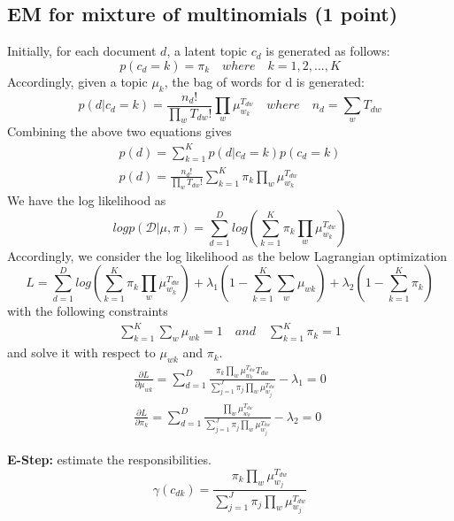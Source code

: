 \documentclass[12pt,a4paper]{article}
\begin{document}
	\subsection{EM for mixture of multinomials (1 point)}
	Initially, for each document $d$, a latent topic $c_d$ is generated as follows:
	\begin{equation}
		p(c_d=k) = \pi_k\quad where \quad k = 1,2,...,K
	\end{equation}
	Accordingly, given a topic $\mu_k$, the bag of words for d is generated:
	\begin{equation}
		p(d|c_d=k) = \frac{n_d!}{\prod_{w}T_{dw}!}\prod_{w}\mu_{w_k}^{T_{dw}}\quad where \quad n_d = \sum_{w} T_{dw}
	\end{equation}
	Combining the above two equations gives
	\begin{align*}
		p(d) = \sum_{k=1}^{K}p(d|c_d=k)p(c_d=k) \\
		p(d) =  \frac{n_d!}{\prod_{w}T_{dw}!}\sum_{k=1}^{K}\pi_k\prod_{w}\mu_{w_k}^{T_{dw}}
	\end{align*}
	We have the log likelihood as
	\begin{equation}
		log p(\mathcal{D}|\mu, \pi)= \sum_{d=1}^{D}log(\sum_{k=1}^{K}\pi_k\prod_{w}\mu_{w_k}^{T_{dw}})
	\end{equation}
	Accordingly, we consider the log likelihood as the below Lagrangian optimization
	\begin{equation}
		L = \sum_{d=1}^{D}log(\sum_{k=1}^{K}\pi_k\prod_{w}\mu_{w_k}^{T_{dw}}) + \lambda_1(1- \sum_{k=1}^{K}\sum_{w}\mu_{wk}) + \lambda_2(1- \sum_{k=1}^{K}\pi_k)
	\end{equation}
	with the following constraints
	\begin{align*}
		\sum_{k=1}^{K}\sum_{w}\mu_{wk} =1 \quad and \quad 
		\sum_{k=1}^{K}\pi_k = 1
	\end{align*}
	and solve it with respect to $\mu_{wk}$ and $\pi_k$.
	\begin{align*}
		\frac{\partial L}{\partial \mu_{wk}} = \sum_{d=1}^{D} \frac{\pi_k\prod_{w}\mu_{w_k}^{T_{dw}}T_{dw}}{\sum_{j=1}^{J}\pi_j\prod_{w}\mu_{w_j}^{T_{dw}}} -\lambda_1 = 0 \\
		\frac{\partial L}{\partial \pi_{k}} =  \sum_{d=1}^{D}
		\frac{\prod_{w}\mu_{w_k}^{T_{dw}}}
		{\sum_{j=1}^{J}\pi_j\prod_{w}\mu_{w_j}^{T_{dw}}} -\lambda_2 = 0
	\end{align*}
	
	\noindent \textbf{E-Step:} estimate the responsibilities. 
	\begin{equation}
		\gamma (c_{dk}) = \frac{\pi_k\prod_{w}\mu_{w_j}^{T_{dw}}}{\sum_{j=1}^{J}\pi_j\prod_{w}\mu_{w_j}^{T_{dw}}}
	\end{equation}
\end{document}
